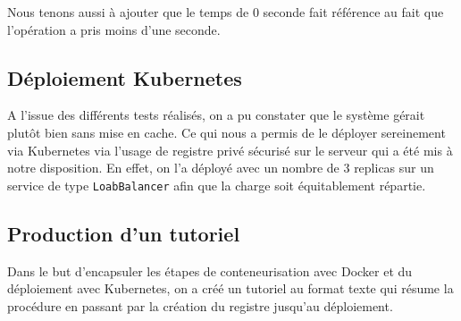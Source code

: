     Nous tenons aussi \`a ajouter que le temps de 0 seconde fait r\'ef\'erence au fait que l'op\'eration a pris moins d'une seconde. \\
    \subsection{D\'eploiement Kubernetes}
A l'issue des diff\'erents tests r\'ealis\'es, on a pu constater que le syst\`eme g\'erait plut\^ot bien sans mise en cache. Ce qui nous a permis de le d\'eployer sereinement via Kubernetes via 
l'usage de registre priv\'e s\'ecuris\'e sur le serveur qui a \'et\'e mis \`a notre disposition. En effet, on l'a d\'eploy\'e avec un nombre de 3 replicas sur un service de type \texttt{LoabBalancer} afin 
que la charge soit \'equitablement r\'epartie.
    \subsection{Production d'un tutoriel}
Dans le but d'encapsuler les \'etapes de conteneurisation avec Docker et du d\'eploiement avec Kubernetes, on a cr\'e\'e un tutoriel au format texte qui r\'esume la proc\'edure en passant par la cr\'eation du registre jusqu'au d\'eploiement.